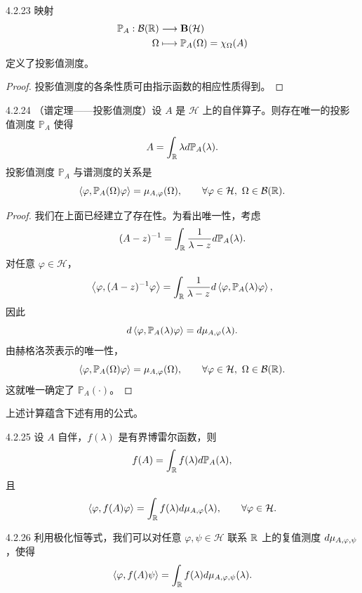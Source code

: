 \begin{proposition}{4.2.23}
  映射
  \[
  \begin{aligned}
  \mathbb{P}_A:\mathcal{B}(\mathbb{R})&\longrightarrow\mathbf{B}(\mathcal{H})\\
  \Omega&\longmapsto\mathbb{P}_A(\Omega)=\chi_\Omega(A)
  \end{aligned}
  \]
  定义了投影值测度。
\end{proposition}

\begin{proof}
  投影值测度的各条性质可由指示函数的相应性质得到。
\end{proof}

\begin{theorem}{4.2.24}
  （谱定理——投影值测度）设 $A$ 是 $\mathcal{H}$ 上的自伴算子。则存在唯一的投影值测度 $\mathbb{P}_A$ 使得
  \[
  A=\int_{\mathbb{R}}\lambda d\mathbb{P}_A(\lambda).
  \]
  投影值测度 $\mathbb{P}_A$ 与谱测度的关系是
  \[
  \ip{\varphi}{\mathbb{P}_A(\Omega)\varphi}=\mu_{A,\varphi}(\Omega),
  \qquad\forall\varphi\in\mathcal{H},\ \Omega\in\mathcal{B}(\R).
  \]
\end{theorem}

\begin{proof}
  我们在上面已经建立了存在性。为看出唯一性，考虑
  \[
  (A-z)^{-1}=\int_{\mathbb{R}}\frac{1}{\lambda-z}d\mathbb{P}_A(\lambda).
  \]
  对任意 $\varphi\in\mathcal{H}$，
  \[
  \left\langle \varphi,(A-z)^{-1}\varphi\right\rangle
  =\int_{\mathbb{R}}\frac{1}{\lambda-z}d\left\langle \varphi,\mathbb{P}_A(\lambda)\varphi\right\rangle,
  \]
  因此
  \[
  d\left\langle \varphi,\mathbb{P}_A(\lambda)\varphi\right\rangle=d\mu_{A,\varphi}(\lambda).
  \]
  由赫格洛茨表示的唯一性，
  \[
  \ip{\varphi}{\mathbb{P}_A(\Omega)\varphi}=\mu_{A,\varphi}(\Omega),
  \qquad\forall\varphi\in\mathcal{H},\ \Omega\in\mathcal{B}(\R).
  \]
  这就唯一确定了 $\mathbb{P}_A(\cdot)$。
\end{proof}

上述计算蕴含下述有用的公式。

\begin{proposition}{4.2.25}
  设 $A$ 自伴，$f(\lambda)$ 是有界博雷尔函数，则
  \[
  f(A)=\int_{\mathbb{R}} f(\lambda)d\mathbb{P}_A(\lambda),
  \]
  且
  \[
  \left\langle \varphi,f(A)\varphi\right\rangle=\int_{\mathbb{R}} f(\lambda)d\mu_{A,\varphi}(\lambda),
  \qquad\forall\varphi\in\mathcal{H}.
  \]
\end{proposition}

\begin{remark}{4.2.26}
  利用极化恒等式，我们可以对任意 $\varphi,\psi\in\mathcal{H}$ 联系 $\mathbb{R}$ 上的复值测度 $d\mu_{A,\varphi,\psi}$，使得
  \[
  \left\langle \varphi,f(A)\psi\right\rangle=\int_{\mathbb{R}} f(\lambda)d\mu_{A,\varphi,\psi}(\lambda).
  \]
\end{remark}

